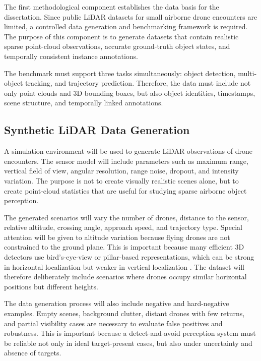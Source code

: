 The first methodological component establishes the data basis for the dissertation. Since public LiDAR datasets for small airborne drone encounters are limited, a controlled data generation and benchmarking framework is required. The purpose of this component is to generate datasets that contain realistic sparse point-cloud observations, accurate ground-truth object states, and temporally consistent instance annotations.

The benchmark must support three tasks simultaneously: object detection, multi-object tracking, and trajectory prediction. Therefore, the data must include not only point clouds and 3D bounding boxes, but also object identities, timestamps, scene structure, and temporally linked annotations.

\subsection{Synthetic LiDAR Data Generation}

A simulation environment will be used to generate LiDAR observations of drone encounters. The sensor model will include parameters such as maximum range, vertical field of view, angular resolution, range noise, dropout, and intensity variation. The purpose is not to create visually realistic scenes alone, but to create point-cloud statistics that are useful for studying sparse airborne object perception.

The generated scenarios will vary the number of drones, distance to the sensor, relative altitude, crossing angle, approach speed, and trajectory type. Special attention will be given to altitude variation because flying drones are not constrained to the ground plane. This is important because many efficient 3D detectors use bird's-eye-view or pillar-based representations, which can be strong in horizontal localization but weaker in vertical localization \cite{lang2019pointpillars,shi2022pillarnet}. The dataset will therefore deliberately include scenarios where drones occupy similar horizontal positions but different heights.

The data generation process will also include negative and hard-negative examples. Empty scenes, background clutter, distant drones with few returns, and partial visibility cases are necessary to evaluate false positives and robustness. This is important because a detect-and-avoid perception system must be reliable not only in ideal target-present cases, but also under uncertainty and absence of targets.

